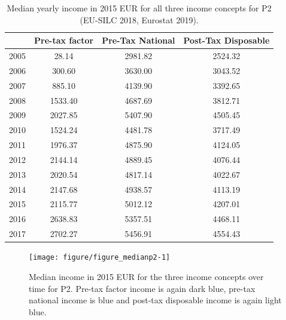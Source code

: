 \documentclass[a4paper]{article}\usepackage[]{graphicx}\usepackage[]{color}
\newenvironment{knitrout}{}{} %
\begin{document}
\begin{table}[ht]
\centering
\begin{tabular}{lccc}
  \toprule
 & Pre-tax factor & Pre-Tax National & Post-Tax Disposable \\ 
  \midrule
2005 & 28.14 & 2981.82 & 2524.32 \\ 
  2006 & 300.60 & 3630.00 & 3043.52 \\ 
  2007 & 885.10 & 4139.90 & 3392.65 \\ 
  2008 & 1533.40 & 4687.69 & 3812.71 \\ 
  2009 & 2027.85 & 5407.90 & 4505.45 \\ 
  2010 & 1524.24 & 4481.78 & 3717.49 \\ 
  2011 & 1976.37 & 4875.90 & 4124.05 \\ 
  2012 & 2144.14 & 4889.45 & 4076.44 \\ 
  2013 & 2020.54 & 4817.14 & 4022.67 \\ 
  2014 & 2147.68 & 4938.57 & 4113.19 \\ 
  2015 & 2115.77 & 5012.12 & 4207.01 \\ 
  2016 & 2638.83 & 5357.51 & 4468.11 \\ 
  2017 & 2702.27 & 5456.91 & 4554.43 \\ 
   \bottomrule
\end{tabular}
\caption{Median yearly income in 2015 EUR for all three income concepts for P2 (EU-SILC 2018, Eurostat 2019).} 
\label{median_p2}
\end{table}


\begin{knitrout}
\color{fgcolor}\begin{figure}[H]

{\centering \texttt{[image: figure/figure\_medianp2-1]} 

}

\caption[Median income in 2015 EUR for the three income concepts over time for P2]{Median income in 2015 EUR for the three income concepts over time for P2. Pre-tax factor income is again dark blue, pre-tax national income is blue and post-tax disposable income is again light blue.}\label{fig:figure_medianp2}
\end{figure}


\end{knitrout}
\end{document}
